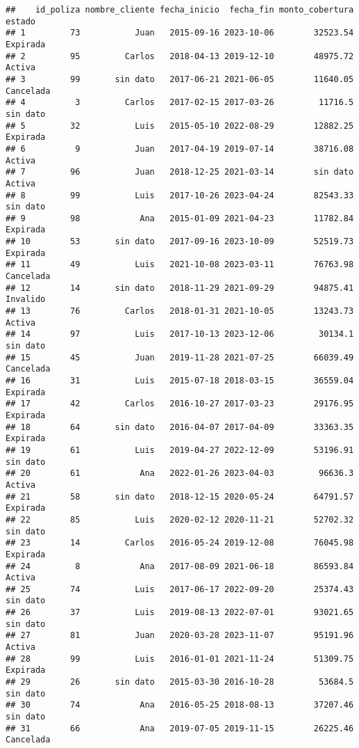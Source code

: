 \documentclass[
]{article}
\begin{document}
\begin{verbatim}
##    id_poliza nombre_cliente fecha_inicio  fecha_fin monto_cobertura    estado
## 1         73           Juan   2015-09-16 2023-10-06        32523.54  Expirada
## 2         95         Carlos   2018-04-13 2019-12-10        48975.72    Activa
## 3         99       sin dato   2017-06-21 2021-06-05        11640.05 Cancelada
## 4          3         Carlos   2017-02-15 2017-03-26         11716.5  sin dato
## 5         32           Luis   2015-05-10 2022-08-29        12882.25  Expirada
## 6          9           Juan   2017-04-19 2019-07-14        38716.08    Activa
## 7         96           Juan   2018-12-25 2021-03-14        sin dato    Activa
## 8         99           Luis   2017-10-26 2023-04-24        82543.33  sin dato
## 9         98            Ana   2015-01-09 2021-04-23        11782.84  Expirada
## 10        53       sin dato   2017-09-16 2023-10-09        52519.73  Expirada
## 11        49           Luis   2021-10-08 2023-03-11        76763.98 Cancelada
## 12        14       sin dato   2018-11-29 2021-09-29        94875.41  Invalido
## 13        76         Carlos   2018-01-31 2021-10-05        13243.73    Activa
## 14        97           Luis   2017-10-13 2023-12-06         30134.1  sin dato
## 15        45           Juan   2019-11-28 2021-07-25        66039.49 Cancelada
## 16        31           Luis   2015-07-18 2018-03-15        36559.04  Expirada
## 17        42         Carlos   2016-10-27 2017-03-23        29176.95  Expirada
## 18        64       sin dato   2016-04-07 2017-04-09        33363.35  Expirada
## 19        61           Luis   2019-04-27 2022-12-09        53196.91  sin dato
## 20        61            Ana   2022-01-26 2023-04-03         96636.3    Activa
## 21        58       sin dato   2018-12-15 2020-05-24        64791.57  Expirada
## 22        85           Luis   2020-02-12 2020-11-21        52702.32  sin dato
## 23        14         Carlos   2016-05-24 2019-12-08        76045.98  Expirada
## 24         8            Ana   2017-08-09 2021-06-18        86593.84    Activa
## 25        74           Luis   2017-06-17 2022-09-20        25374.43  sin dato
## 26        37           Luis   2019-08-13 2022-07-01        93021.65  sin dato
## 27        81           Juan   2020-03-28 2023-11-07        95191.96    Activa
## 28        99           Luis   2016-01-01 2021-11-24        51309.75  Expirada
## 29        26       sin dato   2015-03-30 2016-10-28         53684.5  sin dato
## 30        74            Ana   2016-05-25 2018-08-13        37207.46  sin dato
## 31        66            Ana   2019-07-05 2019-11-15        26225.46 Cancelada

\end{verbatim}
\end{document}
